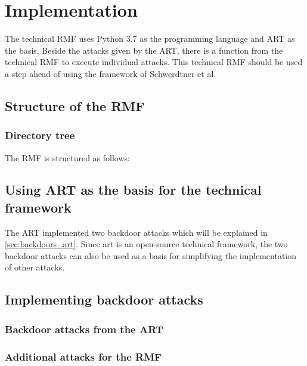 \section{Implementation}
\label{sec:implementation}

The technical RMF uses Python 3.7 as the programming language and ART as the basis. Beside the attacks given by the ART, there is a function from the technical RMF to execute individual attacks. This technical RMF should be used a step ahead of using the framework of Schwerdtner et al.

\subsection{Structure of the RMF}

\subsubsection*{Directory tree}

The RMF is structured as follows:


\subsection{Using ART as the basis for the technical framework}

The ART implemented two backdoor attacks which will be explained in \ref{sec:backdoors_art}. Since art is an open-source technical framework, the two backdoor attacks can also be used as a basis for simplifying the implementation of other attacks.

\subsection{Implementing backdoor attacks}

\subsubsection*{Backdoor attacks from the ART}
\label{sec:backdoors_art}

\subsubsection*{Additional attacks for the RMF}

